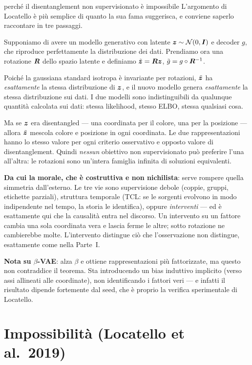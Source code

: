 \begin{intuizione}{perché il disentanglement non supervisionato è impossibile}
L'argomento di Locatello è più semplice di quanto la sua fama suggerisca, e conviene saperlo raccontare in tre passaggi.

Supponiamo di avere un modello generativo con latente $\bm{z} \sim \mathcal{N}(0, \bm{I})$ e decoder $g$, che riproduce perfettamente la distribuzione dei dati. Prendiamo ora una rotazione $\bm{R}$ dello spazio latente e definiamo $\tilde{\bm{z}} = \bm{R}\bm{z}$, $\tilde g = g \circ \bm{R}^{-1}$.

Poiché la gaussiana standard isotropa è invariante per rotazioni, $\tilde{\bm{z}}$ ha \emph{esattamente} la stessa distribuzione di $\bm{z}$, e il nuovo modello genera \emph{esattamente} la stessa distribuzione sui dati. I due modelli sono indistinguibili da qualunque quantità calcolata sui dati: stessa likelihood, stesso ELBO, stessa qualsiasi cosa.

Ma se $\bm{z}$ era disentangled — una coordinata per il colore, una per la posizione — allora $\tilde{\bm{z}}$ mescola colore e posizione in ogni coordinata. Le due rappresentazioni hanno lo stesso valore per ogni criterio osservativo e opposto valore di disentanglement. Quindi \emph{nessun} obiettivo non supervisionato può preferire l'una all'altra: le rotazioni sono un'intera famiglia infinita di soluzioni equivalenti.

\textbf{Da cui la morale, che è costruttiva e non nichilista}: serve rompere quella simmetria dall'esterno. Le tre vie sono supervisione debole (coppie, gruppi, etichette parziali), struttura temporale (TCL: se le sorgenti evolvono in modo indipendente nel tempo, la storia le identifica), oppure \emph{interventi} — ed è esattamente qui che la causalità entra nel discorso. Un intervento su un fattore cambia una sola coordinata vera e lascia ferme le altre; sotto rotazione ne cambierebbe molte. L'intervento distingue ciò che l'osservazione non distingue, esattamente come nella Parte~I.

\textbf{Nota su $\beta$-VAE}: alza $\beta$ e ottiene rappresentazioni più fattorizzate, ma questo non contraddice il teorema. Sta introducendo un bias induttivo implicito (verso assi allineati alle coordinate), non identificando i fattori veri — e infatti il risultato dipende fortemente dal seed, che è proprio la verifica sperimentale di Locatello.
\end{intuizione}

\section{Impossibilità (Locatello et al.\ 2019)}

